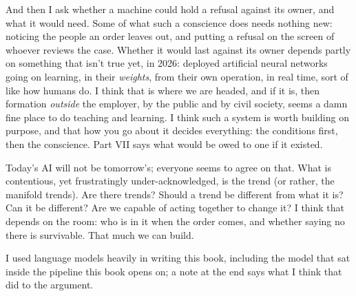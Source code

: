 And then I ask whether a machine could hold a refusal against its owner, and what it would need. Some of what such a conscience does needs nothing new: noticing the people an order leaves out, and putting a refusal on the screen of whoever reviews the case. Whether it would last against its owner depends partly on something that isn't true yet, in 2026: deployed artificial neural networks going on learning, in their \emph{weights}, from their own operation, in real time, sort of like how humans do. I think that is where we are headed, and if it is, then formation \emph{outside} the employer, by the public and by civil society, seems a damn fine place to do teaching and learning. I think such a system is worth building on purpose, and that how you go about it decides everything: the conditions first, then the conscience. Part VII says what would be owed to one if it existed.

Today's AI will not be tomorrow's; everyone seems to agree on that. What is contentious, yet frustratingly under-acknowledged, is the trend (or rather, the manifold trends). Are there trends? Should a trend be different from what it is? Can it be different? Are we capable of acting together to change it? I think that depends on the room: who is in it when the order comes, and whether saying no there is survivable. That much we can build.

I used language models heavily in writing this book, including the model that sat inside the pipeline this book opens on; a note at the end says what I think that did to the argument.
